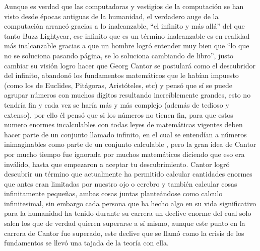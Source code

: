 \documentclass[a4paper,12pt]{article}
\theoremstyle{definition}
\begin{document}
Aunque es verdad que las computadoras y vestigios de la computación se han visto desde épocas antiguas de la humanidad, el verdadero auge de la computación arrancó gracias a lo inalcanzable, “el infinito y más allá” del que tanto Buzz Lightyear, ese infinito que es un término inalcanzable es en realidad más inalcanzable gracias a que un hombre logró entender muy bien que “lo que no se soluciona pasando página, se lo soluciona cambiando de libro”, justo cambiar su visión logro hacer que Georg Cantor se postulará como el descubridor del infinito, abandonó los fundamentos matemáticos que le habían impuesto (como los de Euclides, Pitágoras, Aristóteles, etc) y pensó que sí se puede agrupar números con muchos dígitos resultando increíblemente grandes, esto no tendría fin y cada vez se haría más y más complejo (además de tedioso y extenso), por ello él pensó que si los números no tienen fin, para que estos numero enormes incalculables con todas leyes de matemáticas vigentes deben hacer parte de un conjunto llamado infinito, en el cual se entendían a números inimaginables como parte de un conjunto calculable , pero la gran idea de Cantor por mucho tiempo fue ignorada por muchos matemáticos diciendo que eso era inválido, hasta que empezaron a aceptar tu descubrimiento. Cantor logró descubrir un término que actualmente ha permitido calcular cantidades enormes que antes eran limitadas por nuestro ojo o cerebro y también calcular cosas infinitamente pequeñas, ambas cosas juntas planteándose como calculo infinitesimal, sin embargo cada persona que ha hecho algo en su vida significativo para la humanidad ha tenido durante su carrera un declive enorme del cual solo salen los que de verdad quieren superarse a sí mismo, aunque este punto en la carrera de Cantor fue superado, este declive que se llamó como la crisis de los fundamentos se llevó una tajada de la teoría con ella.
\end{document}
